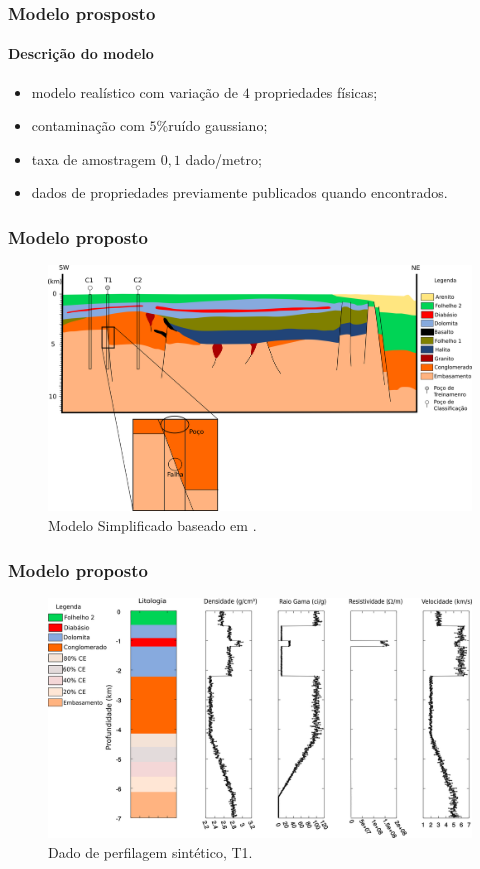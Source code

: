 \documentclass[10pt]{beamer} %
\begin{document}
\begin{frame}
	\frametitle{Modelo prosposto}
	\framesubtitle{Descrição do modelo}
	\begin{itemize}
		\pause 
		\item modelo realístico com variação de $4$ propriedades físicas;
		\pause
		\item contaminação com $5\%$ruído gaussiano;
		\pause
		\item taxa de amostragem $0,1$ dado/metro;
		\pause
		\item dados de propriedades previamente publicados quando encontrados.
	\end{itemize}
	
\end{frame}


\begin{frame}
	\frametitle{Modelo proposto}
	\begin{figure}[H]
		\centering
			\includegraphics[scale=0.35]{Imagens/Modelo.png}
		\caption{Modelo Simplificado baseado em \cite{Sal2008}.}
		\label{modelo}
	\end{figure}
\end{frame}

\begin{frame}
	\frametitle{Modelo proposto}
	\begin{figure}[H]
		\centering
			\includegraphics[scale=0.37]{Imagens/PocoT1.png}
		\caption{Dado de perfilagem sintético, T1. }
		\label{T1}
	\end{figure}
\end{frame}
\end{document}
